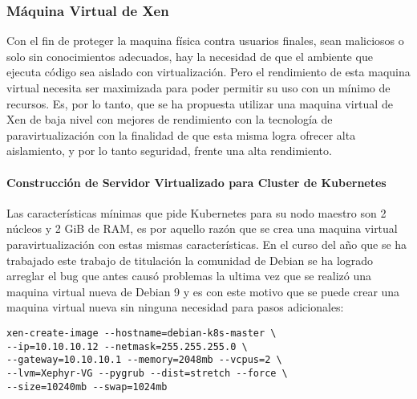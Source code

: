    
\subsubsection{Máquina Virtual de Xen}
Con el fin de proteger la maquina física contra usuarios finales, sean maliciosos o solo sin conocimientos adecuados, hay la necesidad de que el ambiente que ejecuta código sea aislado con virtualización. Pero el rendimiento de esta maquina virtual necesita ser maximizada para poder permitir su uso con un mínimo de recursos. Es, por lo tanto, que se ha propuesta utilizar una maquina virtual de Xen de baja nivel con mejores de rendimiento con la tecnología de paravirtualización con la finalidad de que esta misma logra ofrecer alta aislamiento, y por lo tanto seguridad, frente una alta rendimiento.

\paragraph{Construcción de Servidor Virtualizado para Cluster de Kubernetes}
Las características mínimas que pide Kubernetes para su nodo maestro son 2 núcleos y 2 GiB de RAM, es por aquello razón que se crea una maquina virtual paravirtualización con estas mismas características. En el curso del año que se ha trabajado este trabajo de titulación la comunidad de Debian se ha logrado arreglar  el bug que antes causó problemas la ultima vez que se realizó una maquina virtual nueva de Debian 9 y es con este motivo que se puede crear una maquina virtual nueva sin ninguna necesidad para pasos adicionales:
\begin{lstlisting}
xen-create-image --hostname=debian-k8s-master \
--ip=10.10.10.12 --netmask=255.255.255.0 \
--gateway=10.10.10.1 --memory=2048mb --vcpus=2 \
--lvm=Xephyr-VG --pygrub --dist=stretch --force \
--size=10240mb --swap=1024mb
\end{lstlisting}

\index{Docker}
